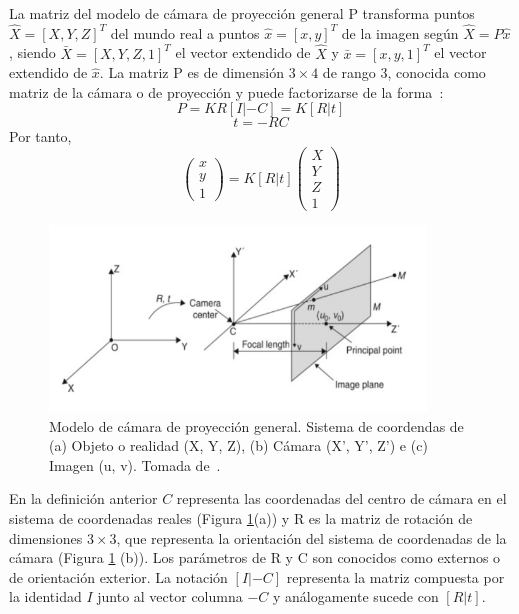 \begin{definition}
	La matriz del modelo de cámara de proyección general P transforma puntos $\hat{X} = [X, Y, Z]^T$ del mundo real a puntos $\hat{x} = [x, y]^T$ de la imagen según $\hat{X} = P\hat{x}$, siendo $\bar{X} = [X, Y, Z, 1]^T$ el vector extendido de $\hat{X}$ y $\bar{x} = [x, y, 1]^T$ el vector extendido de $\hat{x}$. La matriz P es de dimensión $3 \times 4$ de rango 3, conocida como matriz de la cámara o de proyección y puede factorizarse de la forma~\cite{hartley2004camera}:
	\begin{equation}\label{eq:proyGeneral-1}
		P = KR[I| - C] = K[R|t]
	\end{equation}
	\begin{equation}\label{eq:proyGeneral-2}
		t = -RC
	\end{equation}
	Por tanto,
	\begin{equation}\label{eq:proyGeneral-3}
		\begin{pmatrix}
			x\\
			y\\
			1
		\end{pmatrix} = K[R|t] \begin{pmatrix}
			X\\
			Y\\
			Z\\
			1	
		\end{pmatrix}
	\end{equation}
\end{definition}

\begin{figure}[h]
	\centering
	\includegraphics[width=10cm]{./Graphics/modelo-proyeccion-general.png}
	\caption{Modelo de cámara de proyección general. Sistema de coordendas de (a) Objeto o realidad (X, Y, Z), (b) Cámara (X', Y', Z') e (c) Imagen (u, v). Tomada de~\cite{ji2022vision}.}
	\label{fig:proyGeneral}
\end{figure}

En la definición anterior $C$ representa las coordenadas del centro de cámara en el sistema de coordenadas reales (Figura \ref{fig:proyGeneral}(a)) y R es la matriz de rotación de dimensiones $3 \times 3$, que representa la orientación del sistema de coordenadas de la cámara (Figura \ref{fig:proyGeneral} (b)). Los parámetros de R y C son conocidos como externos o de orientación exterior. La notación $[I| - C]$ representa la matriz compuesta por la identidad $I$ junto al vector columna $-C$ y análogamente sucede con $[R|t]$.

